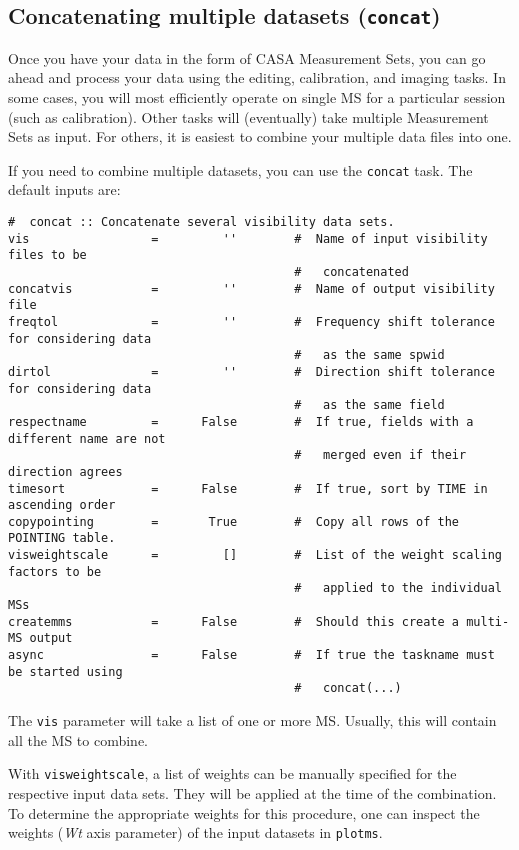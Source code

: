 \subsection{Concatenating multiple datasets ({\tt concat})}
\label{section:io.concat}

Once you have your data in the form of CASA Measurement Sets, you
can go ahead and process your data using the editing, calibration,
and imaging tasks.  In some cases, you will most efficiently operate
on single MS for a particular session (such as calibration).  Other
tasks will (eventually) take multiple Measurement Sets as input.  For others,
it is easiest to combine your multiple data files into one.

If you need to combine multiple datasets, you can use the {\tt concat} task.
The default inputs are:
\small
\begin{verbatim}
#  concat :: Concatenate several visibility data sets.
vis                 =         ''        #  Name of input visibility files to be
                                        #   concatenated
concatvis           =         ''        #  Name of output visibility file
freqtol             =         ''        #  Frequency shift tolerance for considering data
                                        #   as the same spwid
dirtol              =         ''        #  Direction shift tolerance for considering data
                                        #   as the same field
respectname         =      False        #  If true, fields with a different name are not
                                        #   merged even if their direction agrees
timesort            =      False        #  If true, sort by TIME in ascending order
copypointing        =       True        #  Copy all rows of the POINTING table.
visweightscale      =         []        #  List of the weight scaling factors to be
                                        #   applied to the individual MSs
createmms           =      False        #  Should this create a multi-MS output
async               =      False        #  If true the taskname must be started using
                                        #   concat(...)
\end{verbatim}
\normalsize

The {\tt vis} parameter will take a list of one or more MS.  Usually,
this will contain all the MS to combine.

With {\tt visweightscale}, a list of weights can be manually specified
for the respective input data sets. They will be applied at the time
of the combination. To determine the appropriate weights for this
procedure, one can inspect the weights ({\it Wt} axis parameter) of
the input datasets in {\tt plotms}.

